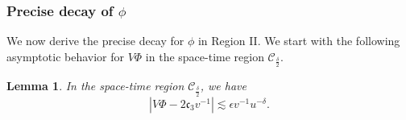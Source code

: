 \documentclass[a4paper,reqno]{amsart}
\newtheorem{lemma}[theorem]{Lemma}
\theoremstyle{definition}
\numberwithin{equation}{section}
\def\ep{\epsilon}
\begin{document}
\subsubsection{Precise decay of $\phi$}
 
 
 We now derive the precise decay for $\phi$ in Region II. We start with the following asymptotic behavior for $V\Phi$ in the space-time region $\mathcal{C}_{\frac{\delta}{2}}$.
 
\begin{lemma}
\label{lem:preciseofVPhiinRegionII}
In the space-time region $\mathcal{C}_{\frac{\delta}{2}}$, we have 
\begin{equation}\label{est:VPhiF}
\left|V\Phi-2\mathfrak{c}_{3}v^{-1}\right|\lesssim \ep v^{-1} u^{-\delta}.
\end{equation}
\end{lemma}
\end{document}
